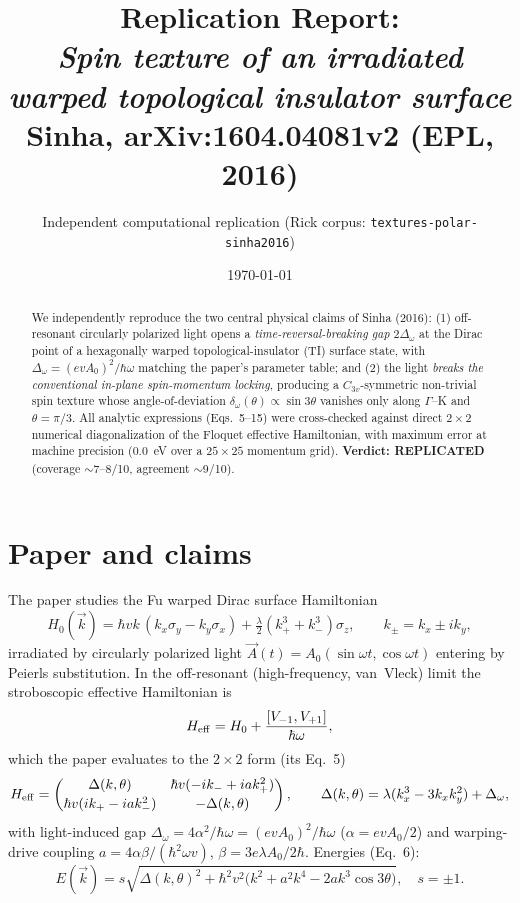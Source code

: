 \documentclass[11pt]{article}
\title{Replication Report: \\ \emph{Spin texture of an irradiated warped topological insulator surface} \\ \normalsize Sinha, arXiv:1604.04081v2 (EPL, 2016)}
\author{Independent computational replication (Rick corpus: \texttt{textures-polar-sinha2016})}
\date{\today}
\newcommand{\hv}{\hbar v}
\newcommand{\dw}{\Delta_\omega}
\begin{document}
\maketitle

\begin{abstract}
We independently reproduce the two central physical claims of Sinha (2016):
(1) off-resonant circularly polarized light opens a \emph{time-reversal-breaking
gap} $2\dw$ at the Dirac point of a hexagonally warped topological-insulator (TI)
surface state, with $\dw=(evA_0)^2/\hbar\omega$ matching the paper's parameter
table; and (2) the light \emph{breaks the conventional in-plane spin-momentum
locking}, producing a $C_{3v}$-symmetric non-trivial spin texture whose
angle-of-deviation $\delta_\omega(\theta)\propto \sin 3\theta$ vanishes only
along $\Gamma$--K and $\theta=\pi/3$. All analytic expressions (Eqs.~5--15) were
cross-checked against direct $2\times2$ numerical diagonalization of the Floquet
effective Hamiltonian, with maximum error at machine precision ($0.0$~eV over a
$25\times25$ momentum grid). \textbf{Verdict: REPLICATED} (coverage $\sim$7--8/10,
agreement $\sim$9/10).
\end{abstract}

\section{Paper and claims}
The paper studies the Fu warped Dirac surface Hamiltonian
\begin{equation}
H_0(\vec k) = \hv k\,(k_x\sigma_y - k_y\sigma_x) + \tfrac{\lambda}{2}(k_+^3 + k_-^3)\sigma_z,
\qquad k_\pm = k_x \pm i k_y,
\end{equation}
irradiated by circularly polarized light $\vec A(t)=A_0(\sin\omega t,\cos\omega t)$
entering by Peierls substitution. In the off-resonant (high-frequency, van~Vleck)
limit the stroboscopic effective Hamiltonian is
\begin{equation}
H_{\rm eff} = H_0 + \frac{[V_{-1},V_{+1}]}{\hbar\omega},
\label{eq:vanvleck}
\end{equation}
which the paper evaluates to the $2\times2$ form (its Eq.~5)
\begin{equation}
H_{\rm eff} = \begin{pmatrix} \Delta(k,\theta) & \hv(-ik_-+iak_+^2)\\[2pt]
\hv(ik_+-iak_-^2) & -\Delta(k,\theta)\end{pmatrix},
\qquad \Delta(k,\theta)=\lambda(k_x^3-3k_xk_y^2)+\dw,
\label{eq:heff}
\end{equation}
with light-induced gap $\dw = 4\alpha^2/\hbar\omega = (evA_0)^2/\hbar\omega$
($\alpha=evA_0/2$) and warping-drive coupling $a = 4\alpha\beta/(\hbar^2\omega v)$,
$\beta=3e\lambda A_0/2\hbar$. Energies (Eq.~6):
\begin{equation}
E(\vec k)=s\sqrt{\Delta(k,\theta)^2+\hbar^2v^2\bigl(k^2+a^2k^4-2ak^3\cos 3\theta\bigr)},
\quad s=\pm 1.
\label{eq:energy}
\end{equation}
\end{document}
